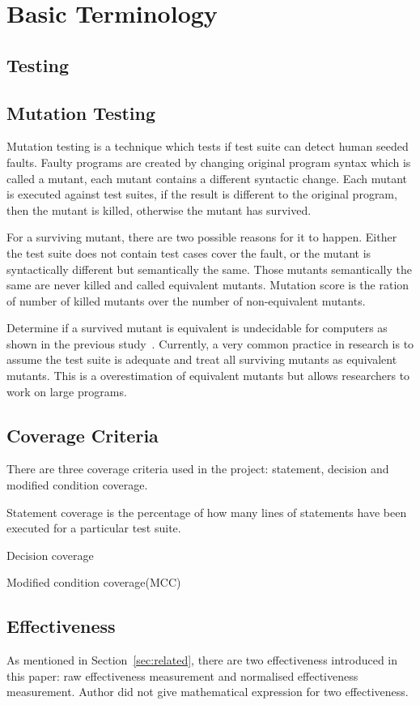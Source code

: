 \section{Basic Terminology}
\subsection{Testing}
\subsection{Mutation Testing}
Mutation testing is a technique which tests if test suite can detect human seeded faults. Faulty programs are created by changing original program syntax which is called a mutant, each mutant contains a different syntactic change. Each mutant is executed against test suites, if the result is different to the original program, then the mutant is killed, otherwise the mutant has survived.

For a surviving mutant, there are two possible reasons for it to happen. Either the test suite does not contain test cases cover the fault, or the mutant is syntactically different but semantically the same. Those mutants semantically the same are never killed and called equivalent mutants. Mutation score is the ration of number of killed mutants over the number of non-equivalent mutants. 

Determine if a survived mutant is equivalent is undecidable for computers as shown in the previous study~\cite{budd1982two}. Currently, a very common practice in research is to assume the test suite is adequate and treat all surviving mutants as equivalent mutants. This is a overestimation of equivalent mutants but allows researchers to work on large programs.

\subsection{Coverage Criteria}
There are three coverage criteria used in the project: statement, decision and modified condition coverage.

Statement coverage is the percentage of how many lines of statements have been executed for a particular test suite. 

Decision coverage

Modified condition coverage(MCC)
\subsection{Effectiveness}
As mentioned in Section~\ref{sec:related}, there are two effectiveness introduced in this paper: raw effectiveness measurement and normalised effectiveness measurement. Author did not give mathematical expression for two effectiveness.

